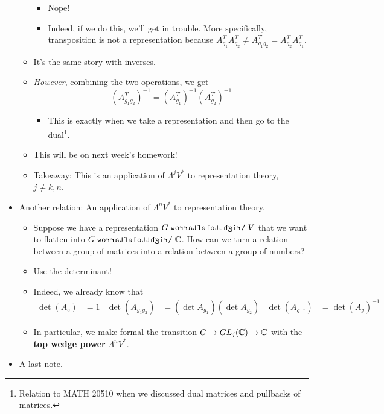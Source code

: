 \documentclass[../notes.tex]{subfiles}
\begin{document}
\begin{itemize}
\begin{itemize}
        \begin{itemize}
            \item Nope!
            \item Indeed, if we do this, we'll get in trouble. More specifically, transposition is not a representation because $A_{g_1}^TA_{g_2}^T\neq A_{g_1g_2}^T=A_{g_2}^TA_{g_1}^T$.
        \end{itemize}
        \item It's the same story with inverses.
        \item \emph{However}, combining the two operations, we get
        \begin{equation*}
            (A_{g_1g_2}^T)^{-1} = (A_{g_1}^T)^{-1}(A_{g_2}^T)^{-1}
        \end{equation*}
        \begin{itemize}
            \item This is exactly when we take a representation and then go to the dual\footnote{Relation to MATH 20510 when we discussed dual matrices and pullbacks of matrices.}.
        \end{itemize}
        \item This will be on next week's homework!
        \item Takeaway: This is an application of $\Lambda^jV^*$ to representation theory, $j\neq k,n$.
    \end{itemize}
    \item Another relation: An application of $\Lambda^nV^*$ to representation theory.
    \begin{itemize}
        \item Suppose we have a representation $G\acts V$ that we want to flatten into $G\acts\C$. How can we turn a relation between a group of matrices into a relation between a group of numbers?
        \item Use the determinant!
        \item Indeed, we already know that
        \begin{align*}
            \det(A_e) &= 1&
            \det(A_{g_1g_2}) &= (\det A_{g_1})(\det A_{g_2})&
            \det(A_{g^{-1}}) &= \det(A_g)^{-1}
        \end{align*}
        \item In particular, we make formal the transition $G\to GL_j(\mathbb{C})\to\mathbb{C}$ with the \textbf{top wedge power} $\Lambda^nV^*$.
    \end{itemize}
    \item A last note.
    \begin{itemize}

\end{itemize}
\end{itemize}
\end{document}
